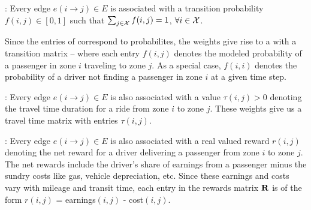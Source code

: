 \begin{comment} %
\spara{Count matrix (\countmatrix)}: 
Every edge $e(i\rightarrow j) \in E$ is associated with an
integer-valued weight $c(i,j)$ that denotes the number of requests
at zone $i$ that had node $j$ as their destination.
\end{comment}

:
Every edge $e(i\rightarrow j) \in E$ is associated with a transition probability
$f(i, j) \in [0,1]$ such that
$\sum_{j \in \mathcal{X}} f(i,j) = 1$, $\forall i \in \mathcal{X}$.  

Since the entries of {\empiricaltransitionmatrix} correspond to probabilites, the weights 
give rise to a {\markovchain} with a transition matrix {\empiricaltransitionmatrix} -- 
where each entry $f(i,j)$ denotes the modeled probability of a passenger in zone $i$
traveling to zone $j$. 
As a special case, 
$f(i,i)$ denotes the probability of a driver not finding a passenger in zone $i$ at a
given time step.


:
Every edge $e(i\rightarrow j) \in E$ is also associated with a value $\tau(i,j) > 0$ 
denoting the travel time duration for a ride from zone $i$ to zone $j$. 
These weights give us a travel time matrix {\traveltimematrix} with entries $\tau(i,j)$. 


:
Every edge $e(i \rightarrow j) \in E$ is also associated with a real valued reward $r(i,j)$ denoting
the net reward for a driver delivering a passenger from zone $i$ to zone $j$. The net rewards include the driver's
share of earnings from a passenger minus the sundry costs like gas, vehicle depreciation, etc.  Since these
earnings and costs vary with mileage and transit time, each entry in the rewards matrix ${\mathbf{R}}$ 
is of the form $r(i,j)$ = earnings$(i,j)$ - cost$(i,j)$.

